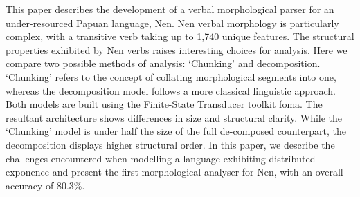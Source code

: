 This paper  describes  the  development  of  a verbal   morphological   parser   for   an   under-resourced  Papuan  language, Nen. Nen  verbal morphology is particularly complex, with a transitive verb taking up to 1,740 unique features. The  structural  properties exhibited  by Nen verbs raises interesting choices for analysis. Here we compare two possible methods of  analysis: ‘Chunking' and decomposition. ‘Chunking' refers to the concept of collating morphological segments into one, whereas the decomposition model follows a more classical linguistic approach. Both models are built using the Finite-State Transducer toolkit foma. The resultant architecture shows differences in size and structural clarity.  While the ‘Chunking' model is under half the size of the full de-composed counterpart, the decomposition displays higher structural order. In this paper, we describe the challenges encountered when modelling a language exhibiting distributed exponence and present the first morphological analyser for Nen, with an overall accuracy of 80.3\%.
